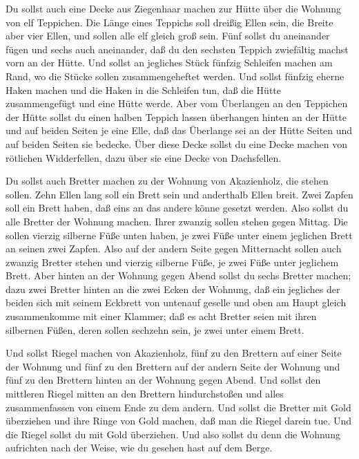  Du sollst auch eine Decke aus Ziegenhaar machen zur Hütte
über die Wohnung von elf Teppichen.  Die Länge eines
Teppichs soll dreißig Ellen sein, die Breite aber vier Ellen, und sollen
alle elf gleich groß sein.  Fünf sollst du aneinander fügen
und sechs auch aneinander, daß du den sechsten Teppich zwiefältig machst
vorn an der Hütte.  Und sollst an jegliches Stück fünfzig
Schleifen machen am Rand, wo die Stücke sollen zusammengeheftet werden.
 Und sollst fünfzig eherne Haken machen und die Haken in
die Schleifen tun, daß die Hütte zusammengefügt und eine Hütte werde.
 Aber vom Überlangen an den Teppichen der Hütte sollst du
einen halben Teppich lassen überhangen hinten an der Hütte 
und auf beiden Seiten je eine Elle, daß das Überlange sei an der Hütte
Seiten und auf beiden Seiten sie bedecke.  Über diese Decke
sollst du eine Decke machen von rötlichen Widderfellen, dazu über sie
eine Decke von Dachsfellen.

 Du sollst auch Bretter machen zu der Wohnung von
Akazienholz, die stehen sollen.  Zehn Ellen lang soll ein
Brett sein und anderthalb Ellen breit.  Zwei Zapfen soll
ein Brett haben, daß eins an das andere könne gesetzt werden. Also
sollst du alle Bretter der Wohnung machen.  Ihrer zwanzig
sollen stehen gegen Mittag.  Die sollen vierzig silberne
Füße unten haben, je zwei Füße unter einem jeglichen Brett an seinen
zwei Zapfen.  Also auf der andern Seite gegen Mitternacht
sollen auch zwanzig Bretter stehen  und vierzig silberne
Füße, je zwei Füße unter jeglichem Brett.  Aber hinten an
der Wohnung gegen Abend sollst du sechs Bretter machen; 
dazu zwei Bretter hinten an die zwei Ecken der Wohnung, 
daß ein jegliches der beiden sich mit seinem Eckbrett von untenauf
geselle und oben am Haupt gleich zusammenkomme mit einer Klammer;
 daß es acht Bretter seien mit ihren silbernen Füßen, deren
sollen sechzehn sein, je zwei unter einem Brett.

 Und sollst Riegel machen von Akazienholz, fünf zu den
Brettern auf einer Seite der Wohnung  und fünf zu den
Brettern auf der andern Seite der Wohnung und fünf zu den Brettern
hinten an der Wohnung gegen Abend.  Und sollst den
mittleren Riegel mitten an den Brettern hindurchstoßen und alles
zusammenfassen von einem Ende zu dem andern.  Und sollst
die Bretter mit Gold überziehen und ihre Ringe von Gold machen, daß man
die Riegel darein tue.  Und die Riegel sollst du mit Gold
überziehen. Und also sollst du denn die Wohnung aufrichten nach der
Weise, wie du gesehen hast auf dem Berge.


